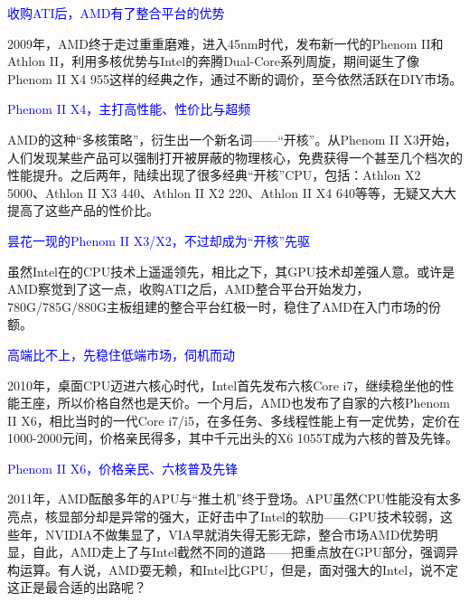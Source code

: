 \documentclass[utf8]{book}
\begin{document}
	
	\begin{flushleft}
		{\large \textcolor{blue}{收购ATI后，AMD有了整合平台的优势\\}}
	\end{flushleft}

	2009年，AMD终于走过重重磨难，进入45nm时代，发布新一代的Phenom II和Athlon II，利用多核优势与Intel的奔腾Dual-Core系列周旋，期间诞生了像Phenom II X4 955这样的经典之作，通过不断的调价，至今依然活跃在DIY市场。
	
	
	\begin{flushleft}
		{\large \textcolor{blue}{Phenom II X4，主打高性能、性价比与超频\\}}
	\end{flushleft}

	AMD的这种“多核策略”，衍生出一个新名词——“开核”。从Phenom II X3开始，人们发现某些产品可以强制打开被屏蔽的物理核心，免费获得一个甚至几个档次的性能提升。之后两年，陆续出现了很多经典“开核”CPU，包括：Athlon X2 5000、Athlon II X3 440、Athlon II X2 220、Athlon II X4 640等等，无疑又大大提高了这些产品的性价比。
	
	\begin{flushleft}
		{\large \textcolor{blue}{昙花一现的Phenom II X3/X2，不过却成为“开核”先驱\\}}
	\end{flushleft}

	虽然Intel在的CPU技术上遥遥领先，相比之下，其GPU技术却差强人意。或许是AMD察觉到了这一点，收购ATI之后，AMD整合平台开始发力，780G/785G/880G主板组建的整合平台红极一时，稳住了AMD在入门市场的份额。
	
	\begin{flushleft}
		{\large \textcolor{blue}{高端比不上，先稳住低端市场，伺机而动\\}}
	\end{flushleft}

	2010年，桌面CPU迈进六核心时代，Intel首先发布六核Core i7，继续稳坐他的性能王座，所以价格自然也是天价。一个月后，AMD也发布了自家的六核Phenom II X6，相比当时的一代Core i7/i5，在多任务、多线程性能上有一定优势，定价在1000-2000元间，价格亲民得多，其中千元出头的X6 1055T成为六核的普及先锋。
	
	
	\begin{flushleft}
		{\large \textcolor{blue}{Phenom II X6，价格亲民、六核普及先锋\\}}
	\end{flushleft}

	2011年，AMD酝酿多年的APU与“推土机”终于登场。APU虽然CPU性能没有太多亮点，核显部分却是异常的强大，正好击中了Intel的软肋——GPU技术较弱，这些年，NVIDIA不做集显了，VIA早就消失得无影无踪，整合市场AMD优势明显，自此，AMD走上了与Intel截然不同的道路——把重点放在GPU部分，强调异构运算。有人说，AMD耍无赖，和Intel比GPU，但是，面对强大的Intel，说不定这正是最合适的出路呢？
	
\end{document}

